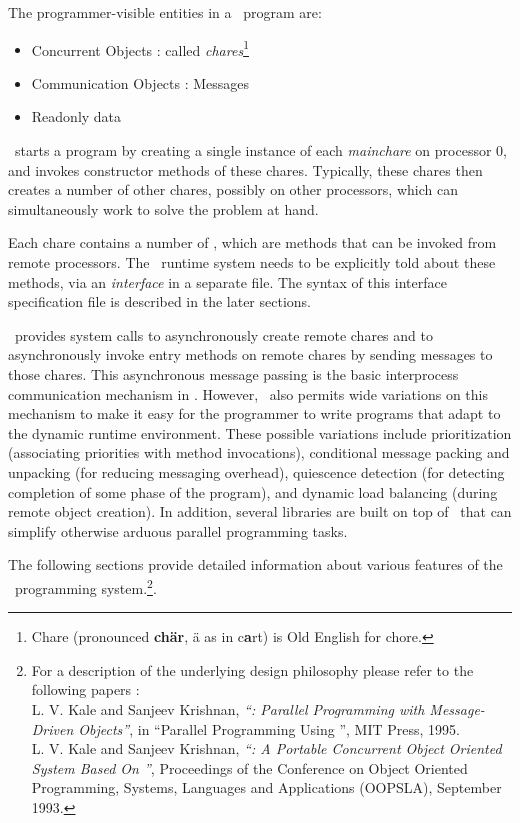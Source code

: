 The programmer-visible entities in a \charmpp\ program are:

\begin{itemize}
\item Concurrent Objects : called {\em chares}\footnote{
      Chare (pronounced {\bf ch\"ar}, \"a as in c{\bf a}rt) is Old 
      English for chore.
      }
\item Communication Objects : Messages
\item Readonly data
\end{itemize}

\charmpp\ starts a program by creating a single  instance of each
{\em mainchare} on processor 0, and invokes constructor methods of these
chares.  Typically, these chares then creates a number of other 
chares, possibly on other processors, which can simultaneously work to solve
the problem at hand.

Each chare contains a number of , which are methods that can be invoked from remote processors. The
\charmpp\ runtime system needs to be explicitly told about these methods, via
an {\em interface} in a separate file.  The syntax of this interface
specification file is described in the later sections.

\charmpp\ provides system calls to asynchronously create remote 
chares and to asynchronously invoke entry methods on remote chares by sending
 messages to those chares. This asynchronous
message passing is the basic interprocess communication
mechanism in \charmpp. However, \charmpp\ also permits wide variations on this
mechanism to make it easy for the programmer to write programs that adapt to
the dynamic runtime environment.  These possible variations include
prioritization (associating priorities with method invocations), conditional
message packing and unpacking (for reducing messaging
overhead), quiescence detection (for detecting completion of
some phase of the program), and dynamic load balancing (during remote object
creation). In addition, several libraries are built on top of \charmpp\ that
can simplify otherwise arduous parallel programming tasks.

The following sections provide detailed information about various features of the
\charmpp\ programming system.\footnote{For a description of the underlying design
philosophy please refer to the following papers :\\
    L. V. Kale and Sanjeev Krishnan,
    {\em ``\charmpp : Parallel Programming with Message-Driven Objects''},
    in ``Parallel Programming Using \CC'',
    MIT Press, 1995. \\
    L. V. Kale and Sanjeev Krishnan,
    {\em ``\charmpp : A Portable Concurrent Object Oriented System
    Based On \CC''},
    Proceedings of the Conference on Object Oriented Programming,
    Systems, Languages and Applications (OOPSLA), September 1993.
}.
